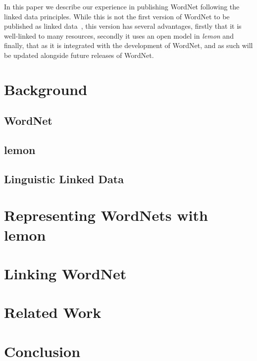 \documentclass[10pt, a4paper]{article}
\begin{document}
In this paper we describe our experience
in publishing WordNet following the linked data principles. While this is not
the first version of WordNet to be published as linked data~\cite{?, ?, ?}, this
version has several advantages, firstly that it is well-linked to many
resources, secondly it uses an open model in \emph{lemon} and finally, that as
it is integrated with the development of WordNet, and as such will be updated alongside
future releases of WordNet.

\section{Background}

\subsection{WordNet}

\subsection{lemon}

\subsection{Linguistic Linked Data}

\section{Representing WordNets with lemon}

\section{Linking WordNet}

\section{Related Work}

\section{Conclusion}



\end{document}
